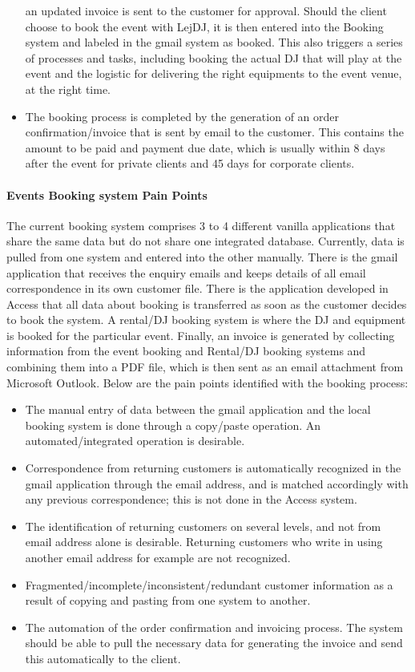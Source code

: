 \documentclass[envcountsame]{llncs}
\begin{document}
\begin{itemize}
  an updated invoice is sent to the customer for approval.  Should the
  client choose to book the event with LejDJ, it is then entered into
  the Booking system and labeled in the gmail system as booked. This
  also triggers a series of processes and tasks, including booking the
  actual DJ that will play at the event and the logistic for
  delivering the right equipments to the event venue, at the right
  time.
\item The booking process is completed by the generation of an order
  confirmation/invoice that is sent by email to the customer. This
  contains the amount to be paid and payment due date, which is
  usually within 8 days after the event for private clients and 45
  days for corporate clients.
\end{itemize}


\paragraph{Events Booking system Pain Points}

The current booking system comprises 3 to 4 different vanilla
applications that share the same data but do not share one integrated
database. Currently, data is pulled from one system and entered into
the other manually. There is the gmail application that receives the
enquiry emails and keeps details of all email correspondence in its
own customer file. There is the application developed in Access that
all data about booking is transferred as soon as the customer decides
to book the system. A rental/DJ booking system is where the DJ and
equipment is booked for the particular event. Finally, an invoice is
generated by collecting information from the event booking and
Rental/DJ booking systems and combining them into a PDF file, which is
then sent as an email attachment from Microsoft Outlook. Below are the
pain points identified with the booking process:

\begin{itemize}
\item The manual entry of data between the gmail application and the
  local booking system is done through a copy/paste operation.  An
  automated/integrated operation is desirable.
\item Correspondence from returning customers is automatically
  recognized in the gmail application through the email address, and
  is matched accordingly with any previous correspondence; this is not
  done in the Access system.
\item The identification of returning customers on several levels, and
  not from email address alone is desirable. Returning customers who
  write in using another email address for example are not recognized.
\item Fragmented/incomplete/inconsistent/redundant customer
  information as a result of copying and pasting from one system to
  another.
\item The automation of the order confirmation and invoicing
  process. The system should be able to pull the necessary data for
  generating the invoice and send this automatically to the client.
\end{itemize}
\end{document}
